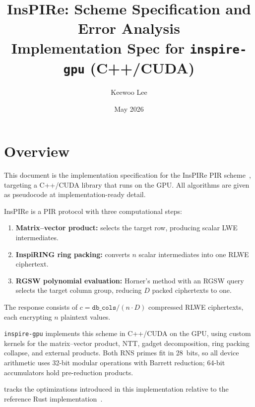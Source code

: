 \documentclass[11pt,a4paper]{article}
\title{\textbf{InsPIRe: Scheme Specification and Error Analysis}\\[6pt]
\large Implementation Spec for \texttt{inspire-gpu} (C++/CUDA)}
\author{Keewoo Lee}
\date{May 2026}
\begin{document}
\maketitle

\section{Overview}\label{sec:overview}

This document is the implementation specification for the InsPIRe PIR scheme~\cite{inspire2025}, targeting a C++/CUDA library that runs on the GPU.
All algorithms are given as pseudocode at implementation-ready detail.

InsPIRe is a PIR protocol with three computational steps:
\begin{enumerate}[nosep]
    \item \textbf{Matrix--vector product:} selects the target row, producing scalar LWE intermediates.
    \item \textbf{InspiRING ring packing:} converts $n$ scalar intermediates into one RLWE ciphertext.
    \item \textbf{RGSW polynomial evaluation:} Horner's method with an RGSW query selects the target column group, reducing $D$ packed ciphertexts to one.
\end{enumerate}
The response consists of $c = \texttt{db\_cols}/(n \cdot D)$ compressed RLWE ciphertexts, each encrypting $n$ plaintext values.

\texttt{inspire-gpu} implements this scheme in C++/CUDA on the GPU, using custom kernels for the matrix--vector product, NTT, gadget decomposition, ring packing collapse, and external products. Both RNS primes fit in 28~bits, so all device arithmetic uses 32-bit modular operations with Barrett reduction; 64-bit accumulators hold pre-reduction products.

 tracks the optimizations introduced in this implementation relative to the reference Rust implementation~\cite{inspire2025}.
\end{document}
